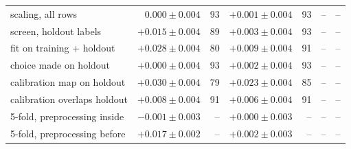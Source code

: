 \begin{table}[htbp]
{\begin{tabular}{lrrrrrr}
scaling, all rows & $0.000\pm0.004$ & 93 & $+0.001\pm0.004$ & 93 & -- & -- \\
screen, holdout labels & $+0.015\pm0.004$ & 89 & $+0.003\pm0.004$ & 93 & -- & -- \\
fit on training + holdout & $+0.028\pm0.004$ & 80 & $+0.009\pm0.004$ & 91 & -- & -- \\
choice made on holdout & $+0.000\pm0.004$ & 93 & $+0.002\pm0.004$ & 93 & -- & -- \\
calibration map on holdout & $+0.030\pm0.004$ & 79 & $+0.023\pm0.004$ & 85 & -- & -- \\
calibration overlaps holdout & $+0.008\pm0.004$ & 91 & $+0.006\pm0.004$ & 91 & -- & -- \\
5-fold, preprocessing inside & $-0.001\pm0.003$ & -- & $+0.000\pm0.003$ & -- & -- & -- \\
5-fold, preprocessing before & $+0.017\pm0.002$ & -- & $+0.002\pm0.003$ & -- & -- & -- \\
\bottomrule
\end{tabular}%
}
\end{table}
